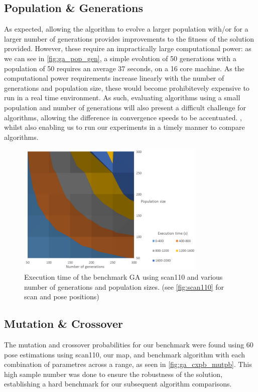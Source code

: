 \documentclass[authoryearcitations]{UoYCSproject}
\begin{document}
\subsection{Population \& Generations}
As expected, allowing the algorithm to evolve a larger population with/or for a larger number of generations provides improvements to the fitness of the solution provided. However, these require an impractically large computational power: as we can see in \autoref{fig:ga_pop_gen}, a simple evolution of 50 generations with a population of 50 requires an average 37 seconds, on a 16 core machine. As the computational power requirements increase linearly with the number of generations and population size, these would become prohibitevely expensive to run in a real time environment. As such, evaluating algorithms using a small population and number of generations will also present a difficult challenge for algorithms, allowing the difference in convergence speeds to be accentuated. , whilst also enabling us to run our experiments in a timely manner to compare algorithms. 
\begin{figure}[]
\centering
	\includegraphics[width=9cm,keepaspectratio]{images/ga_pop_gen_sweep.png}
	\caption{Execution time of the benchmark GA using scan110 and various number of generations and population sizes. (see \autoref{fig:scan110} for scan and pose positions)}
	\label{fig:ga_pop_gen}
\end{figure}

\subsection{Mutation \& Crossover}
\label{subsec:benchmark_mutpb_cxpb}
The mutation and crossover probabilities for our benchmark were found using 60 pose estimations using scan110, our map, and benchmark algorithm with each combination of parametres across a range, as seen in \autoref{fig:ga_cxpb_mutpb}. This high sample number was done to ensure the robustness of the solution, establishing a hard benchmark for our subsequent algorithm comparisons.
\end{document}
